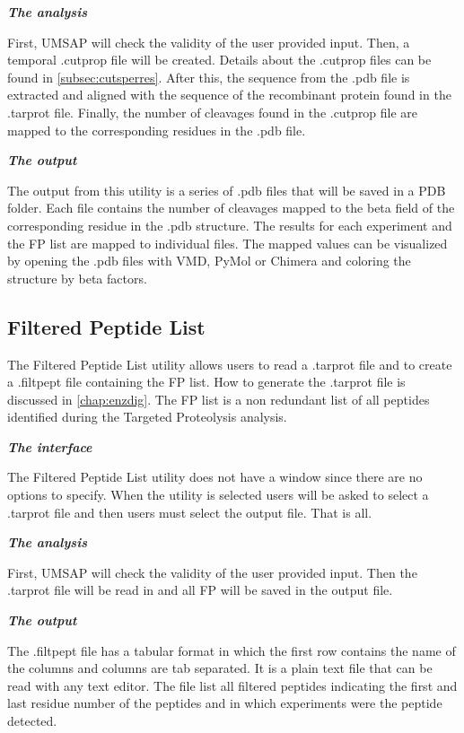\textit{\textbf{The analysis}}

First, UMSAP will check the validity of the user provided input. Then, a temporal .cutprop file will be created. Details about the .cutprop files can be found in \autoref{subsec:cutsperres}. After this, the sequence from the .pdb file is extracted and aligned with the sequence of the recombinant protein found in the .tarprot file. Finally, the number of cleavages found in the .cutprop file are mapped to the corresponding residues in the .pdb file.

\textit{\textbf{The output}}

The output from this utility is a series of .pdb files that will be saved in a PDB folder. Each file contains the number of cleavages mapped to the beta field of the corresponding residue in the .pdb structure. The results for each experiment and the FP list are mapped to individual files. The mapped values can be visualized by opening the .pdb files with VMD, PyMol or Chimera and coloring the structure by beta factors.

\subsection{Filtered Peptide List}
\label{subsec:filtpeptfile}

The Filtered Peptide List utility allows users to read a .tarprot file and to create a .filtpept file containing the FP list. How to generate the .tarprot file is discussed in \autoref{chap:enzdig}. The FP list is a non redundant list of all peptides identified during the Targeted Proteolysis analysis.

\textit{\textbf{The interface}}

The Filtered Peptide List utility does not have a window since there are no options to specify. When the utility is selected users will be asked to select a .tarprot file and then users must select the output file. That is all.

\textit{\textbf{The analysis}}

First, UMSAP will check the validity of the user provided input. Then the .tarprot file will be read in and all FP will be saved in the output file.

\textit{\textbf{The output}}

The .filtpept file has a tabular format in which the first row contains the name of the columns and columns are tab separated. It is a plain text file that can be read with any text editor. The file list all filtered peptides indicating the first and last residue number of the peptides and in which experiments were the peptide detected.

